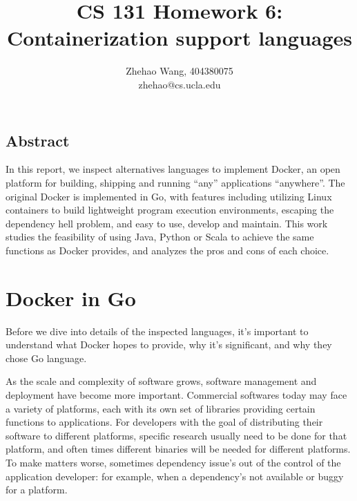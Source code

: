 \documentclass[letterpaper,twocolumn,10pt]{article}
\begin{document}
\date{}

\title{\Large \bf CS 131 Homework 6: Containerization support languages}

\author{
{\rm Zhehao Wang, 404380075}\\
zhehao@cs.ucla.edu
} %

\maketitle

\thispagestyle{empty}

\subsection*{Abstract}

In this report, we inspect alternatives languages to implement Docker, an open platform for building, shipping and running ``any'' applications ``anywhere''. The original Docker is implemented in Go, with features including utilizing Linux containers to build lightweight program execution environments, escaping the dependency hell problem, and easy to use, develop and maintain. This work studies the feasibility of using Java, Python or Scala to achieve the same functions as Docker provides, and analyzes the pros and cons of each choice. \cite{DockerSite}

\section{Docker in Go}

Before we dive into details of the inspected languages, it's important to understand what Docker hopes to provide, why it's significant, and why they chose Go language.

As the scale and complexity of software grows, software management and deployment have become more important. Commercial softwares today may face a variety of platforms, each with its own set of libraries providing certain functions to applications. For developers with the goal of distributing their software to different platforms, specific research usually need to be done for that platform, and often times different binaries will be needed for different platforms. To make matters worse, sometimes dependency issue's out of the control of the application developer: for example, when a dependency's not available or buggy for a platform.
\end{document}
